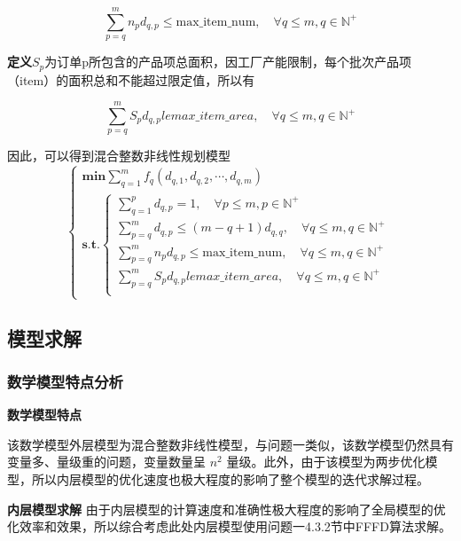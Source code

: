\documentclass[bwprint]{gmcmthesis}
\begin{document}
\begin{equation}   
    \sum_{p=q}^{m} n_pd_{q,p} \le \text{max\_item\_num},\quad \forall q \le m, q\in \mathbb{N}^+
\end{equation}

\textbf{定义}$S_p$为订单p所包含的产品项总面积，因工厂产能限制，每个批次产品项（item）的面积总和不能超过限定值，所以有

\begin{equation}   
    \sum_{p=q}^{m} S_pd_{q,p} le max\_item\_area,\quad \forall q\le m,q\in \mathbb{N}^+
\end{equation}

因此，可以得到混合整数非线性规划模型
\begin{equation}
    \begin{cases}
        \mathbf{min} \sum_{q=1}^{m} f_q(d_{q,1},d_{q,2},\cdots,d_{q,m}) \\
        \mathbf{s.t.}
        \begin{cases}
            \sum_{q=1}^{p} d_{q,p}=1,\quad \forall p\le m,p \in \mathbb{N}^+ \\
            \sum_{p=q}^{m} d_{q,p} \le (m-q+1)d_{q,q},\quad \forall q\le m,q\in \mathbb{N}^+  \\
            \sum_{p=q}^{m} n_pd_{q,p} \le \text{max\_item\_num},\quad \forall q \le m, q\in \mathbb{N}^+\\
            \sum_{p=q}^{m} S_pd_{q,p} le max\_item\_area,\quad \forall q\le m,q\in \mathbb{N}^+ \\
        \end{cases}  \label{问题二模型}
    \end{cases}
\end{equation}


\subsection{模型求解}
\subsubsection{数学模型特点分析}
	\textbf{数学模型特点} 
	
    该数学模型外层模型为混合整数非线性模型，与问题一类似，该数学模型仍然具有变量多、量级重的问题，变量数量呈 $ n^2 $ 量级。此外，由于该模型为两步优化模型，所以内层模型的优化速度也极大程度的影响了整个模型的迭代求解过程。
	
	\textbf{内层模型求解} 由于内层模型的计算速度和准确性极大程度的影响了全局模型的优化效率和效果，所以综合考虑此处内层模型使用问题一4.3.2节中FFFD算法求解。
	
\end{document}
